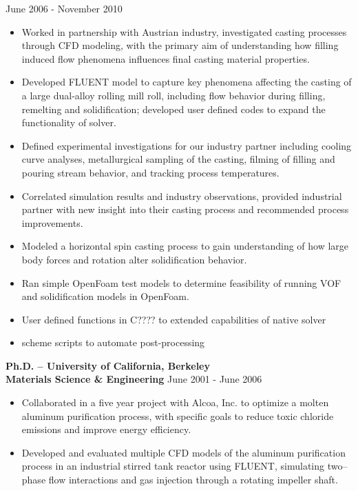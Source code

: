 \documentclass[11pt]{res} %
\begin{document}
\begin{resume}
June 2006 - November 2010
   \begin{itemize} \itemsep -1pt  %
\item Worked in partnership with Austrian industry, investigated casting processes through CFD modeling, with the primary aim of understanding how filling induced flow phenomena influences final casting material properties. 
 \item Developed FLUENT model to capture key phenomena affecting the casting of a large dual-alloy rolling mill roll, including flow behavior during filling, remelting and solidification; developed user defined codes to expand the functionality of solver. 
\item Defined experimental investigations for our industry partner including cooling curve analyses, metallurgical sampling of the casting, filming of filling and pouring stream behavior, and tracking process temperatures.
\item Correlated simulation results and industry observations, provided industrial partner with new insight into their casting process and recommended process improvements.    
\item Modeled a horizontal spin casting process to gain understanding of how large body forces and rotation alter solidification behavior.   
\item Ran simple OpenFoam test models to determine feasibility of running VOF and solidification models in OpenFoam.  
\item User defined functions in C???? to extended capabilities of native solver
\item scheme scripts to automate post-processing
\end{itemize}
%
{\bf Ph.D. -- University of California, Berkeley} \\
{\bf Materials Science \& Engineering}
June 2001 - June 2006 
\begin{itemize} \itemsep -1pt 
	\item Collaborated in a five year project with Alcoa, Inc. to optimize a molten aluminum purification process, with specific goals to reduce toxic chloride emissions and improve energy efficiency.
	\item Developed and evaluated multiple CFD models of the aluminum purification process in an industrial stirred tank reactor using FLUENT, simulating two--phase flow interactions and gas injection through a rotating impeller shaft.

\end{itemize}
\end{resume}
\end{document}
